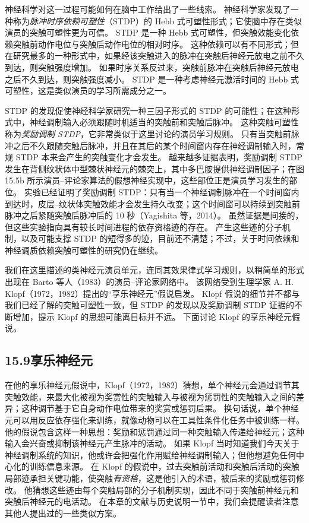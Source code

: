 \documentclass[UTF8, 12pt, fontset=fandol, oneside]{ctexart}
\begin{document}
神经科学对这一过程可能如何在脑中工作给出了一些线索。
神经科学家发现了一种称为\emph{脉冲时序依赖可塑性}（STDP）的 Hebb 式可塑性形式；它使脑中存在类似演员的突触可塑性更为可信。
STDP 是一种 Hebb 式可塑性，但突触效能变化依赖突触前动作电位与突触后动作电位的相对时序。
这种依赖可以有不同形式；但在研究最多的一种形式中，如果经该突触进入的脉冲在突触后神经元放电之前不久到达，则突触强度增加。
如果时序关系反过来，突触前脉冲在突触后神经元放电之后不久到达，则突触强度减小。
STDP 是一种考虑神经元激活时间的 Hebb 式可塑性，这是类似演员的学习所需成分之一。

STDP 的发现促使神经科学家研究一种三因子形式的 STDP 的可能性；在这种形式中，神经调制输入必须跟随时机适当的突触前和突触后脉冲。
这种突触可塑性称为\emph{奖励调制 STDP}，它非常类似于这里讨论的演员学习规则。
只有当突触前脉冲之后不久跟随突触后脉冲，并且在其后的某个时间窗内存在神经调制输入时，常规 STDP 本来会产生的突触变化才会发生。
越来越多证据表明，奖励调制 STDP 发生在背侧纹状体中型棘状神经元的棘突上，其中多巴胺提供神经调制因子；在图 15.5b 所示演员--评论家算法的假想神经实现中，这些部位正是演员学习发生的部位。
实验已经证明了奖励调制 STDP：只有当一个神经调制脉冲在一个时间窗内到达时，皮层--纹状体突触效能才会发生持久改变；这个时间窗可以持续到突触前脉冲之后紧随突触后脉冲后的 10 秒（Yagishita 等，2014）。
虽然证据是间接的，但这些实验指向具有较长时间进程的依存资格迹的存在。
产生这些迹的分子机制，以及可能支撑 STDP 的短得多的迹，目前还不清楚；不过，关于时间依赖和神经调质依赖突触可塑性的研究仍在继续。

我们在这里描述的类神经元演员单元，连同其效果律式学习规则，以稍简单的形式出现在 Barto 等人（1983）的演员--评论家网络中。
该网络受到生理学家 A. H. Klopf（1972，1982）提出的“享乐神经元”假说启发。
Klopf 假说的细节并不都与我们已经了解的突触可塑性一致，但 STDP 的发现以及奖励调制 STDP 证据的不断增加，提示 Klopf 的思想可能离目标并不远。
下面讨论 Klopf 的享乐神经元假说。

\subsection*{15.9\quad 享乐神经元}

在他的享乐神经元假说中，Klopf（1972，1982）猜想，单个神经元会通过调节其突触效能，来最大化被视为奖赏性的突触输入与被视为惩罚性的突触输入之间的差异；这种调节基于它自身动作电位带来的奖赏或惩罚后果。
换句话说，单个神经元可以用反应依存强化来训练，就像动物可以在工具性条件化任务中被训练一样。
他的假说包含这样一种思想：奖励和惩罚通过同一种突触输入传递给神经元；这种输入会兴奋或抑制该神经元产生脉冲的活动。
如果 Klopf 当时知道我们今天关于神经调制系统的知识，他或许会把强化作用赋给神经调制输入；但他想避免任何中心化的训练信息来源。
在 Klopf 的假说中，过去突触前活动和突触后活动的突触局部迹承担关键功能，使突触\emph{有资格}，这是他引入的术语，被后来的奖励或惩罚修改。
他猜想这些迹由每个突触局部的分子机制实现，因此不同于突触前神经元和突触后神经元的电活动。
在本章的文献与历史说明一节中，我们会提醒读者注意其他人提出过的一些类似方案。
\end{document}
